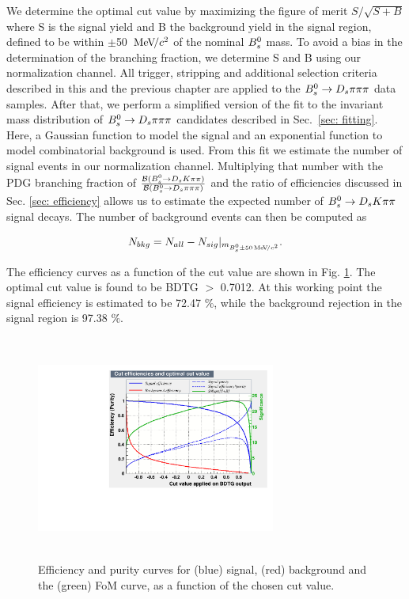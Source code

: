        
We determine the optimal cut value by maximizing the figure of merit $S/\sqrt{S+B}$ where S is the signal yield and B the background yield in the signal region, defined to be within $\pm$50 ${\mathrm{\,Me\kern -0.1em V\!/}c^2}$ of the nominal ${{B}^0_{s}}$ mass. 
To avoid a bias in the determination of the branching fraction, we determine S and B using our normalization channel. 
All trigger, stripping and additional selection criteria described in this and the previous chapter are applied to the ${{B}^0_{s}}\rightarrow{\ensuremath{{D}_{s}}}{\ensuremath{\pi}}{\ensuremath{\pi}}{\ensuremath{\pi}}$ data samples. 
After that, we perform a simplified version of the fit to the invariant mass distribution of ${{B}^0_{s}}\rightarrow{\ensuremath{{D}_{s}}}{\ensuremath{\pi}}{\ensuremath{\pi}}{\ensuremath{\pi}}$ candidates described in Sec.~\ref{sec: fitting}.
Here, a Gaussian function to model the signal and an exponential function to model combinatorial background is used.
From this fit we estimate the number of signal events in our normalization channel. 
Multiplying that number with the PDG branching fraction of $\frac{\mathcal{B}({{B}^0_{s}}\rightarrow{\ensuremath{{D}_{s}}}{\ensuremath{K}}{\ensuremath{\pi}}{\ensuremath{\pi}})}{\mathcal{B}({{B}^0_{s}}\rightarrow{\ensuremath{{D}_{s}}}{\ensuremath{\pi}}{\ensuremath{\pi}}{\ensuremath{\pi}})}$ and the ratio of efficiencies discussed in Sec. \ref{sec: efficiency} allows us to estimate the expected number of ${{B}^0_{s}}\rightarrow{\ensuremath{{D}_{s}}}{\ensuremath{K}}{\ensuremath{\pi}}{\ensuremath{\pi}}$ signal decays. The number of background events can then be computed as

\begin{equation}
 N_{bkg}=N_{all}-N_{sig}|_{m_{{{B}^0_{s}}\pm50{\mathrm{\,Me\kern -0.1em V\!/}c^2}}}.   
\end{equation}

The efficiency curves as a function of the cut value are shown in Fig. \ref{fig:BDT_Efficiency}. 
The optimal cut value is found to be BDTG $>$ 0.7012. At this working point the signal efficiency is estimated to be 72.47 $\%$, while the background rejection in the signal region is 97.38 $\%$. 


\begin{figure}[h]
\includegraphics[height=7.4cm,width=0.7\textwidth]{figs/BDT_CutEfficiency.pdf}
\caption{Efficiency and purity curves for (blue) signal, (red) background and the (green) FoM curve, as a function of the chosen cut value.}
\label{fig:BDT_Efficiency}
\end{figure}






